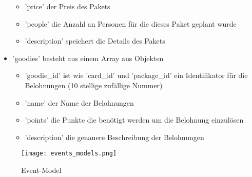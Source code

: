 \begin{itemize}
\begin{itemize}
						\item 'price' der Preis des Pakets
						\item 'people' die Anzahl an Personen für die dieses Paket geplant wurde
						\item 'description' speichert die Details des Pakets
					\end{itemize}
					\item 'goodies' besteht aus einem Array aus Objekten
					\begin{itemize}
						\item 'goodie\_id' ist wie 'card\_id' und 'package\_id' ein Identifikator für die Belohnungen (10 stellige zufällige Nummer)
						\item 'name' der Name der Belohnungen
						\item 'points' die Punkte die benötigt werden um die Belohnung einzulösen
						\item 'description' die genauere Beschreibung der Belohnungen
					\end{itemize}				
				\end{itemize}
			
			\begin{figure}[h]
				\centering
				\texttt{[image: events\_models.png]}
				\caption{Event-Model}
			\end{figure}	
			
			\newpage		
				
